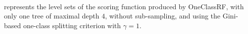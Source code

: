 \paragraph{}
 represents the level sets of the scoring function
produced by \ac{OneClassRF}, with only one tree
of maximal depth $4$,
without sub-sampling, and using the Gini-based one-class splitting criterion
with $\gamma=1$.
%
%
%
%
